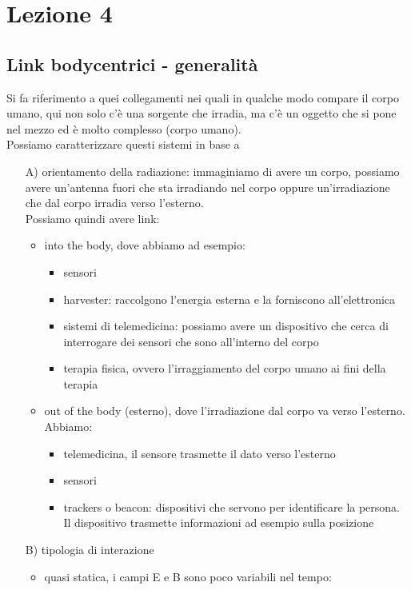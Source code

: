 \documentclass[oneside, 12pt]{extbook}
\begin{document}
\chapter{Lezione 4}
\section{Link bodycentrici - generalità}
Si fa riferimento a quei collegamenti nei quali in qualche modo compare il corpo umano, qui non solo c'è una sorgente che irradia, ma c'è un oggetto che si pone nel mezzo ed è molto complesso (corpo umano).\\Possiamo caratterizzare questi sistemi in base a 
\begin{itemize}
	\item[A)] orientamento della radiazione: immaginiamo di avere un corpo, possiamo avere un'antenna fuori che sta irradiando nel corpo oppure un'irradiazione che dal corpo irradia verso l'esterno.\\Possiamo quindi avere link:
	\begin{itemize}
		\item into the body, dove abbiamo ad esempio:
		\begin{itemize}
			\item sensori
			\item harvester: raccolgono l'energia esterna e la forniscono all'elettronica 
			\item sistemi di telemedicina: possiamo avere un dispositivo che cerca di interrogare dei sensori che sono all'interno del corpo
			\item terapia fisica, ovvero l'irraggiamento del corpo umano ai fini della terapia
		\end{itemize}
		\item out of the body (esterno), dove l'irradiazione dal corpo va verso l'esterno. Abbiamo:
		\begin{itemize}
			\item telemedicina, il sensore trasmette il dato verso l'esterno
			\item sensori
			\item trackers o beacon: dispositivi che servono per identificare la persona. Il dispositivo trasmette informazioni ad esempio sulla posizione
		\end{itemize} 
	\end{itemize}
	\item[B)] tipologia di interazione
	\begin{itemize}
		\item quasi statica, i campi E e B sono poco variabili nel tempo:

\end{itemize}
\end{itemize}
\end{document}
